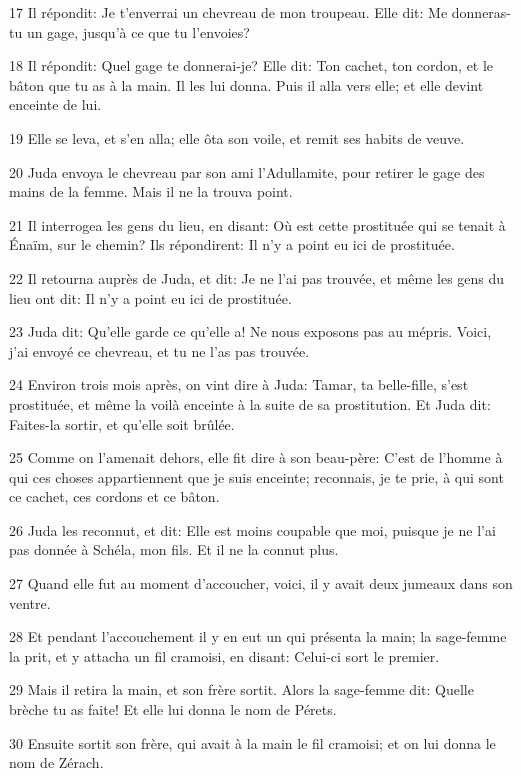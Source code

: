 \par 17 Il répondit: Je t'enverrai un chevreau de mon troupeau. Elle dit: Me donneras-tu un gage, jusqu'à ce que tu l'envoies?
\par 18 Il répondit: Quel gage te donnerai-je? Elle dit: Ton cachet, ton cordon, et le bâton que tu as à la main. Il les lui donna. Puis il alla vers elle; et elle devint enceinte de lui.
\par 19 Elle se leva, et s'en alla; elle ôta son voile, et remit ses habits de veuve.
\par 20 Juda envoya le chevreau par son ami l'Adullamite, pour retirer le gage des mains de la femme. Mais il ne la trouva point.
\par 21 Il interrogea les gens du lieu, en disant: Où est cette prostituée qui se tenait à Énaïm, sur le chemin? Ils répondirent: Il n'y a point eu ici de prostituée.
\par 22 Il retourna auprès de Juda, et dit: Je ne l'ai pas trouvée, et même les gens du lieu ont dit: Il n'y a point eu ici de prostituée.
\par 23 Juda dit: Qu'elle garde ce qu'elle a! Ne nous exposons pas au mépris. Voici, j'ai envoyé ce chevreau, et tu ne l'as pas trouvée.
\par 24 Environ trois mois après, on vint dire à Juda: Tamar, ta belle-fille, s'est prostituée, et même la voilà enceinte à la suite de sa prostitution. Et Juda dit: Faites-la sortir, et qu'elle soit brûlée.
\par 25 Comme on l'amenait dehors, elle fit dire à son beau-père: C'est de l'homme à qui ces choses appartiennent que je suis enceinte; reconnais, je te prie, à qui sont ce cachet, ces cordons et ce bâton.
\par 26 Juda les reconnut, et dit: Elle est moins coupable que moi, puisque je ne l'ai pas donnée à Schéla, mon fils. Et il ne la connut plus.
\par 27 Quand elle fut au moment d'accoucher, voici, il y avait deux jumeaux dans son ventre.
\par 28 Et pendant l'accouchement il y en eut un qui présenta la main; la sage-femme la prit, et y attacha un fil cramoisi, en disant: Celui-ci sort le premier.
\par 29 Mais il retira la main, et son frère sortit. Alors la sage-femme dit: Quelle brèche tu as faite! Et elle lui donna le nom de Pérets.
\par 30 Ensuite sortit son frère, qui avait à la main le fil cramoisi; et on lui donna le nom de Zérach.

